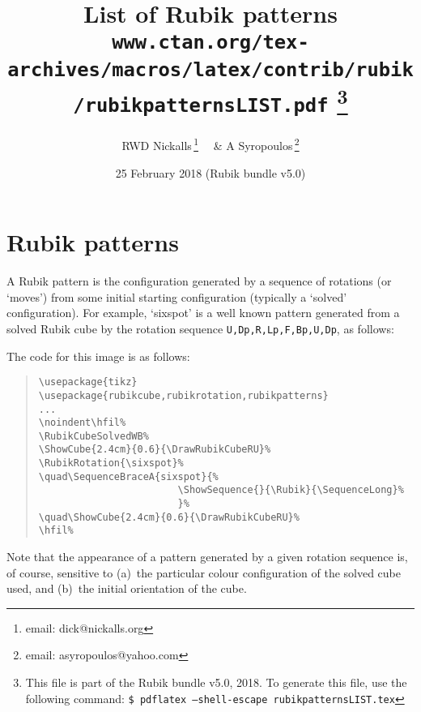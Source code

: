 \documentclass[a4paper]{article}
\begin{document}
\ifpdf{}\fi
\title{List of Rubik patterns\\%
\smallskip\normalsize\texttt{www.ctan.org/tex-archives/macros/latex/contrib/rubik/rubikpatternsLIST.pdf}%
\footnote{This file is part of the Rubik bundle v5.0, 2018. 
To generate this file, use the following command: 
\newline \texttt{\$ pdflatex --shell-escape  rubikpatternsLIST.tex}}}
\author{RWD Nickalls\,\footnote{email: \textsf{dick@nickalls.org}}%
  \ \ \& A Syropoulos\,\footnote{email: \textsf{asyropoulos@yahoo.com}}}
\date{25 February 2018 (Rubik bundle v5.0)}
\maketitle


\section{Rubik patterns}

A Rubik pattern  is the configuration generated by a sequence of rotations 
(or `moves') from some initial starting configuration (typically a `solved' 
configuration). For example, `sixspot' is a well known pattern  generated  
from a solved Rubik cube by the  rotation sequence 
 \texttt{U,Dp,R,Lp,F,Bp,U,Dp}, as follows:

\bigskip

\noindent\hfil%
\RubikCubeSolvedWB
{}%
\RubikRotation{\sixspot}%
\quad{}\quad%
%
\hfil%

\bigskip

\medskip
{\noindent}The code for this image is as follows:

\begin{quote}
\begin{verbatim}
\usepackage{tikz}
\usepackage{rubikcube,rubikrotation,rubikpatterns} 
...
\noindent\hfil%
\RubikCubeSolvedWB%
\ShowCube{2.4cm}{0.6}{\DrawRubikCubeRU}%
\RubikRotation{\sixspot}%
\quad\SequenceBraceA{sixspot}{%
                        \ShowSequence{}{\Rubik}{\SequenceLong}%
                        }%
\quad\ShowCube{2.4cm}{0.6}{\DrawRubikCubeRU}%
\hfil%
\end{verbatim}
\end{quote}


Note that the  appearance of a pattern generated by  a given 
rotation sequence is, of course, sensitive  to 
(a)~the particular colour configuration of the solved 
cube used, and (b)~the initial  orientation of the cube.
\end{document}
